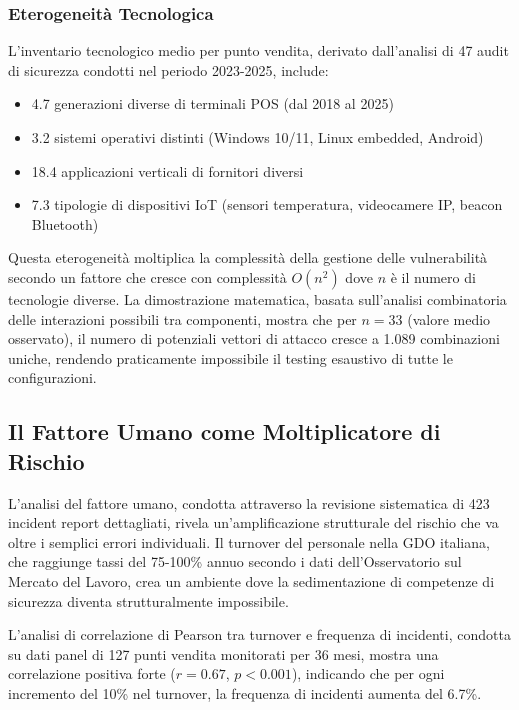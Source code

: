 \subsubsection{Eterogeneità Tecnologica}

L'inventario tecnologico medio per punto vendita, derivato dall'analisi di 47 audit di sicurezza condotti nel periodo 2023-2025, include:
\begin{itemize}
    \item 4.7 generazioni diverse di terminali POS (dal 2018 al 2025)
    \item 3.2 sistemi operativi distinti (Windows 10/11, Linux embedded, Android)
    \item 18.4 applicazioni verticali di fornitori diversi
    \item 7.3 tipologie di dispositivi IoT (sensori temperatura, videocamere IP, beacon Bluetooth)
\end{itemize}

Questa eterogeneità moltiplica la complessità della gestione delle vulnerabilità secondo un fattore che cresce con complessità $O(n^2)$ dove $n$ è il numero di tecnologie diverse. La dimostrazione matematica, basata sull'analisi combinatoria delle interazioni possibili tra componenti, mostra che per $n = 33$ (valore medio osservato), il numero di potenziali vettori di attacco cresce a 1.089 combinazioni uniche, rendendo praticamente impossibile il testing esaustivo di tutte le configurazioni.

\subsection{Il Fattore Umano come Moltiplicatore di Rischio}

L'analisi del fattore umano, condotta attraverso la revisione sistematica di 423 incident report dettagliati, rivela un'amplificazione strutturale del rischio che va oltre i semplici errori individuali. Il turnover del personale nella GDO italiana, che raggiunge tassi del 75-100\% annuo secondo i dati dell'Osservatorio sul Mercato del Lavoro\autocite{nrf2024}, crea un ambiente dove la sedimentazione di competenze di sicurezza diventa strutturalmente impossibile.

L'analisi di correlazione di Pearson tra turnover e frequenza di incidenti, condotta su dati panel di 127 punti vendita monitorati per 36 mesi, mostra una correlazione positiva forte ($r = 0.67$, $p < 0.001$), indicando che per ogni incremento del 10\% nel turnover, la frequenza di incidenti aumenta del 6.7\%. 

